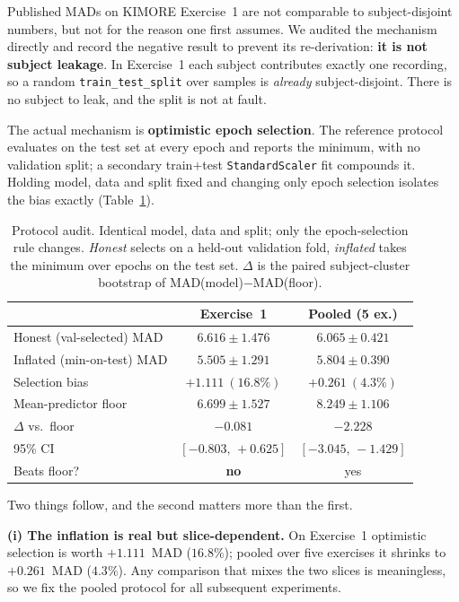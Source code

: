 \documentclass[10pt,journal]{IEEEtran}
\begin{document}
Published MADs on KIMORE Exercise~1 are not comparable to subject-disjoint numbers, but not for
the reason one first assumes. We audited the mechanism directly and record the negative result to
prevent its re-derivation: \textbf{it is not subject leakage}. In Exercise~1 each subject
contributes exactly one recording, so a random \texttt{train\_test\_split} over samples is
\emph{already} subject-disjoint. There is no subject to leak, and the split is not at fault.

The actual mechanism is \textbf{optimistic epoch selection}. The reference protocol evaluates on
the test set at every epoch and reports the minimum, with no validation split; a secondary
train$+$test \texttt{StandardScaler} fit compounds it. Holding model, data and split fixed and
changing only epoch selection isolates the bias exactly (Table~\ref{tab:protocol}).

\begin{table}[!t]
\centering
\caption{Protocol audit. Identical model, data and split; only the epoch-selection rule changes.
\emph{Honest} selects on a held-out validation fold, \emph{inflated} takes the minimum over epochs
on the test set. $\Delta$ is the paired subject-cluster bootstrap of MAD(model)$-$MAD(floor).}
\label{tab:protocol}
\footnotesize
\setlength{\tabcolsep}{4pt}
\begin{tabular}{lcc}
\toprule
 & Exercise~1 & Pooled (5 ex.) \\
\midrule
Honest (val-selected) MAD   & $6.616 \pm 1.476$ & $6.065 \pm 0.421$ \\
Inflated (min-on-test) MAD  & $5.505 \pm 1.291$ & $5.804 \pm 0.390$ \\
Selection bias              & $+1.111\ (16.8\%)$ & $+0.261\ (4.3\%)$ \\
\midrule
Mean-predictor floor        & $6.699 \pm 1.527$ & $8.249 \pm 1.106$ \\
$\Delta$ vs.\ floor         & $-0.081$ & $-2.228$ \\
95\% CI                     & $[-0.803,\, +0.625]$ & $[-3.045,\, -1.429]$ \\
Beats floor?                & \textbf{no} & yes \\
\bottomrule
\end{tabular}
\end{table}

Two things follow, and the second matters more than the first.

\textbf{(i) The inflation is real but slice-dependent.} On Exercise~1 optimistic selection is worth
$+1.111$~MAD ($16.8\%$); pooled over five exercises it shrinks to $+0.261$~MAD ($4.3\%$). Any
comparison that mixes the two slices is meaningless, so we fix the pooled protocol for all
subsequent experiments.
\end{document}
